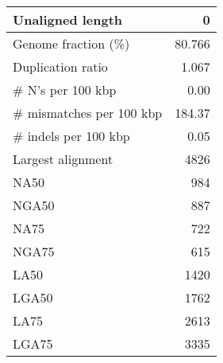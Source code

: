 \documentclass[12pt,a4paper]{article}
\begin{document}
\begin{table}[ht]
\begin{center}
\begin{tabular}{|l*{1}{|r}|}
Unaligned length & 0 \\ \hline
Genome fraction (\%) & 80.766 \\ \hline
Duplication ratio & 1.067 \\ \hline
\# N's per 100 kbp & 0.00 \\ \hline
\# mismatches per 100 kbp & 184.37 \\ \hline
\# indels per 100 kbp & 0.05 \\ \hline
Largest alignment & 4826 \\ \hline
NA50 & 984 \\ \hline
NGA50 & 887 \\ \hline
NA75 & 722 \\ \hline
NGA75 & 615 \\ \hline
LA50 & 1420 \\ \hline
LGA50 & 1762 \\ \hline
LA75 & 2613 \\ \hline
LGA75 & 3335 \\ \hline
\end{tabular}
\end{center}
\end{table}
\end{document}

